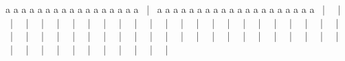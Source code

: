 a\nl
a\nl
a\nl
a\nl
a\nl
a\nl
a\nl
a\nl
a\nl
a\nl
a\nl
a\nl
a\nl
a\nl
a\nl
a\nl
a\nl
\the\pagegoal\ |\ \the\pagetotal
a\nl
a\nl
a\nl
a\nl
a\nl
a\nl
a\nl
a\nl
a\nl
a\nl
a\nl
a\nl
a\nl
a\nl
a\nl
a\nl
a\nl
a\nl
a\nl
a\nl
\clearpage
\the\pagegoal\ |\ \the\pagetotal\nl
\the\pagegoal\ |\ \the\pagetotal\nl
\the\pagegoal\ |\ \the\pagetotal\nl
\the\pagegoal\ |\ \the\pagetotal\nl
\the\pagegoal\ |\ \the\pagetotal\nl
\the\pagegoal\ |\ \the\pagetotal\nl
\the\pagegoal\ |\ \the\pagetotal\nl
\the\pagegoal\ |\ \the\pagetotal\nl
\the\pagegoal\ |\ \the\pagetotal\nl
\the\pagegoal\ |\ \the\pagetotal\nl
\the\pagegoal\ |\ \the\pagetotal\nl
\the\pagegoal\ |\ \the\pagetotal\nl
\the\pagegoal\ |\ \the\pagetotal\nl
\the\pagegoal\ |\ \the\pagetotal\nl
\the\pagegoal\ |\ \the\pagetotal\nl
\the\pagegoal\ |\ \the\pagetotal\nl
\the\pagegoal\ |\ \the\pagetotal\nl
\the\pagegoal\ |\ \the\pagetotal\nl
\the\pagegoal\ |\ \the\pagetotal\nl
\the\pagegoal\ |\ \the\pagetotal\nl
\the\pagegoal\ |\ \the\pagetotal\nl
\the\pagegoal\ |\ \the\pagetotal\nl
\the\pagegoal\ |\ \the\pagetotal\nl
\the\pagegoal\ |\ \the\pagetotal\nl
\the\pagegoal\ |\ \the\pagetotal\nl
\the\pagegoal\ |\ \the\pagetotal\nl
\the\pagegoal\ |\ \the\pagetotal\nl
\the\pagegoal\ |\ \the\pagetotal\nl
\the\pagegoal\ |\ \the\pagetotal\nl
\the\pagegoal\ |\ \the\pagetotal\nl
\the\pagegoal\ |\ \the\pagetotal\nl
\the\pagegoal\ |\ \the\pagetotal\nl
\the\pagegoal\ |\ \the\pagetotal\nl
\the\pagegoal\ |\ \the\pagetotal\nl
\the\pagegoal\ |\ \the\pagetotal\nl
\the\pagegoal\ |\ \the\pagetotal\nl
\the\pagegoal\ |\ \the\pagetotal\nl
\the\pagegoal\ |\ \the\pagetotal\nl
\the\pagegoal\ |\ \the\pagetotal\nl
\the\pagegoal\ |\ \the\pagetotal\nl
\the\pagegoal\ |\ \the\pagetotal\nl
\the\pagegoal\ |\ \the\pagetotal\nl
\the\pagegoal\ |\ \the\pagetotal\nl
\the\pagegoal\ |\ \the\pagetotal\nl
\the\pagegoal\ |\ \the\pagetotal\nl
\the\pagegoal\ |\ \the\pagetotal\nl
\the\pagegoal\ |\ \the\pagetotal\nl
\the\pagegoal\ |\ \the\pagetotal\nl
\the\pagegoal\ |\ \the\pagetotal\nl
\the\pagegoal\ |\ \the\pagetotal\nl
\the\pagegoal\ |\ \the\pagetotal\nl
\the\pagegoal\ |\ \the\pagetotal\nl
\the\pagegoal\ |\ \the\pagetotal\nl
\the\pagegoal\ |\ \the\pagetotal\nl
\the\pagegoal\ |\ \the\pagetotal\nl
\the\pagegoal\ |\ \the\pagetotal\nl
\the\pagegoal\ |\ \the\pagetotal\nl




\showRemainingHeightOnLastPage